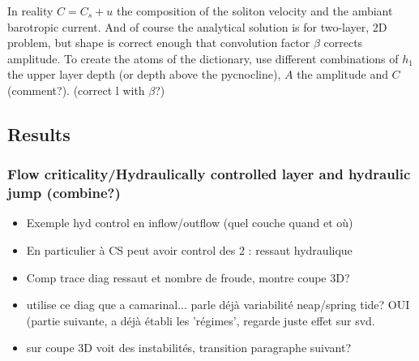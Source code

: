 In reality $C=C_s+u$ the composition of the soliton velocity and the ambiant barotropic current. And of course the analytical solution is for two-layer, 2D problem, but shape is correct enough that convolution factor $\beta$ corrects amplitude. To create the atoms of the dictionary, use different combinations of $h_1$ the upper layer depth (or depth above the pycnocline), $A$ the amplitude and $C$  (comment?). (correct l with $\beta$?)


\subsection{Results}


\subsubsection{Flow criticality/Hydraulically controlled layer and hydraulic jump (combine?)}

\begin{itemize}
\item Exemple hyd control en inflow/outflow (quel couche quand et où)
\item En particulier à CS peut avoir control des 2 : ressaut hydraulique
\item Comp trace diag ressaut et nombre de froude, montre coupe 3D?
\item utilise ce diag que a camarinal... parle déjà variabilité neap/spring tide? OUI (partie suivante, a déjà établi les 'régimes', regarde juste effet sur svd.
\item sur coupe 3D voit des instabilités, transition paragraphe suivant?
\end{itemize}

